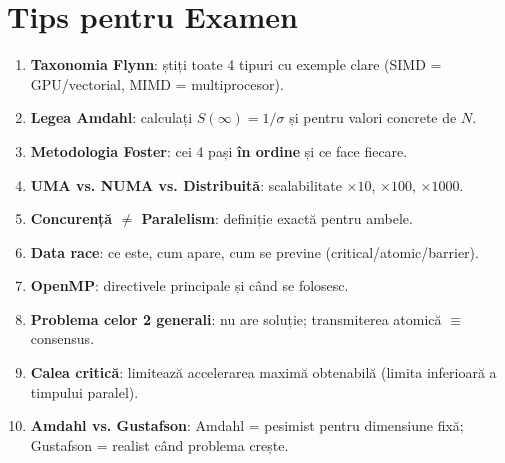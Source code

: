 \documentclass[a4paper,11pt]{article}
\begin{document}
\section{Tips pentru Examen}

\begin{enumerate}
  \item \textbf{Taxonomia Flynn}: știți toate 4 tipuri cu exemple clare (SIMD = GPU/vectorial, MIMD = multiprocesor).
  \item \textbf{Legea Amdahl}: calculați $S(\infty) = 1/\sigma$ și pentru valori concrete de $N$.
  \item \textbf{Metodologia Foster}: cei 4 pași \textbf{în ordine} și ce face fiecare.
  \item \textbf{UMA vs. NUMA vs. Distribuită}: scalabilitate $\times 10$, $\times 100$, $\times 1000$.
  \item \textbf{Concurență $\neq$ Paralelism}: definiție exactă pentru ambele.
  \item \textbf{Data race}: ce este, cum apare, cum se previne (critical/atomic/barrier).
  \item \textbf{OpenMP}: directivele principale și când se folosesc.
  \item \textbf{Problema celor 2 generali}: nu are soluție; transmiterea atomică $\equiv$ consensus.
  \item \textbf{Calea critică}: limitează accelerarea maximă obtenabilă (limita inferioară a timpului paralel).
  \item \textbf{Amdahl vs. Gustafson}: Amdahl = pesimist pentru dimensiune fixă; Gustafson = realist când problema crește.
\end{enumerate}
\end{document}
